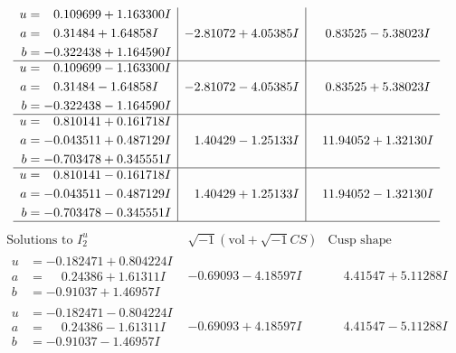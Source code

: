 \documentclass[1p]{elsarticle_modified}
\theoremstyle{definition}
\newcommand{\I}{\sqrt{-1}}
\begin{document}
$$\begin{array}{c|c|c}
\begin{aligned}
u &= \phantom{-}0.109699 + 1.163300 I \\
a &= \phantom{-}0.31484 + 1.64858 I \\
b &= -0.322438 + 1.164590 I\end{aligned}
 & -2.81072 + 4.05385 I & \phantom{-}0.83525 - 5.38023 I \\ \hline\begin{aligned}
u &= \phantom{-}0.109699 - 1.163300 I \\
a &= \phantom{-}0.31484 - 1.64858 I \\
b &= -0.322438 - 1.164590 I\end{aligned}
 & -2.81072 - 4.05385 I & \phantom{-}0.83525 + 5.38023 I \\ \hline\begin{aligned}
u &= \phantom{-}0.810141 + 0.161718 I \\
a &= -0.043511 + 0.487129 I \\
b &= -0.703478 + 0.345551 I\end{aligned}
 & \phantom{-}1.40429 - 1.25133 I & \phantom{-}11.94052 + 1.32130 I \\ \hline\begin{aligned}
u &= \phantom{-}0.810141 - 0.161718 I \\
a &= -0.043511 - 0.487129 I \\
b &= -0.703478 - 0.345551 I\end{aligned}
 & \phantom{-}1.40429 + 1.25133 I & \phantom{-}11.94052 - 1.32130 I\\
 \hline 
 \end{array}$$\newpage$$\begin{array}{c|c|c}  
\text{Solutions to }I^u_{2}& \I (\text{vol} + \sqrt{-1}CS) & \text{Cusp shape}\\
 \hline 
\begin{aligned}
u &= -0.182471 + 0.804224 I \\
a &= \phantom{-}0.24386 + 1.61311 I \\
b &= -0.91037 + 1.46957 I\end{aligned}
 & -0.69093 - 4.18597 I & \phantom{-}4.41547 + 5.11288 I \\ \hline\begin{aligned}
u &= -0.182471 - 0.804224 I \\
a &= \phantom{-}0.24386 - 1.61311 I \\
b &= -0.91037 - 1.46957 I\end{aligned}
 & -0.69093 + 4.18597 I & \phantom{-}4.41547 - 5.11288 I \\ \hline\begin{aligned}

\end{aligned}
\end{array}$$
\end{document}
